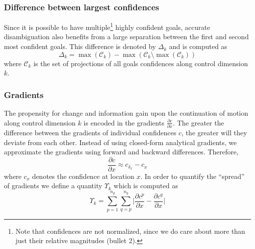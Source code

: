 \documentclass[conference]{IEEEtran}
\begin{document}
\subsubsection{Difference between largest confidences}
Since it is possible to have multiple\footnote{Note that confidences are not normalized, since we do care about more than just their relative magnitudes (bullet 2).} highly confident goals, accurate disambiguation also benefits from a large separation between the first and second most confident goals. 
This difference is denoted by $\Delta_{k}$ and is computed as
\begin{equation*}
\Delta_{k} = \max(\mathcal{C}_k) - \max(\mathcal{C}_k \setminus {\max(\mathcal{C}_k)})
\end{equation*}
where $\mathcal{C}_k$ is the set of projections of all goals confidences along control dimension $k$.
\subsubsection{Gradients}\label{COMP4}
The propensity for change and information gain upon the continuation of motion along control dimension $k$ is encoded in the gradients $\frac{\partial c}{\partial x}$. The greater the difference between the gradients of individual confidences $c$, the greater will they deviate from each other.  Instead of using closed-form analytical gradients, we approximate the gradients using forward and backward differences. Therefore, 
\begin{equation*}
\frac{\partial c}{\partial x} \approx c_{\delta_x} - c_{x} 
\end{equation*}
where $c_x$ denotes the confidence at location $x$.
In order to quantify the ``spread'' of gradients we define a quantity $\Upsilon_{k}$ which is computed as 
\begin{equation*}
\Upsilon_{k} = \sum_{p=1}^{n_g}\sum_{q=p}^{n_g}\Big \lvert\frac{\partial c^p}{\partial x} - \frac{\partial c^q}{\partial x}\Big \rvert
\end{equation*}
\end{document}
